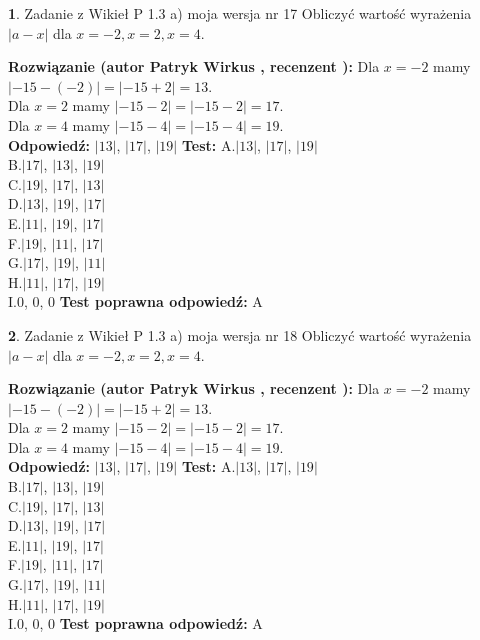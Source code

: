 \documentclass[12pt, a4paper]{article}
\theoremstyle{definition} %
\newtheorem{zad}{}
\newcommand{\zadStart}[1]{\begin{zad}#1\newline}
\newcommand{\zadStop}{\end{zad}}
\newcommand{\rozwStart}[2]{\noindent \textbf{Rozwiązanie (autor #1 , recenzent #2): }\newline}
\newcommand{\rozwStop}{\newline}
\newcommand{\odpStart}{\noindent \textbf{Odpowiedź:}\newline}
\newcommand{\odpStop}{\newline}
\newcommand{\testStart}{\noindent \textbf{Test:}\newline}
\newcommand{\testStop}{\newline}
\newcommand{\kluczStart}{\noindent \textbf{Test poprawna odpowiedź:}\newline}
\newcommand{\kluczStop}{\newline}
\begin{document}
\zadStart{Zadanie z Wikieł P 1.3 a) moja wersja nr 17}
Obliczyć wartość wyrażenia $|a - x|$ dla $x=-2,x=2,x=4$.
\zadStop
\rozwStart{Patryk Wirkus}{}
Dla $x = -2$ mamy $|-15 - (-2)| = |-15 + 2| = 13$.\\
Dla $x = 2$ mamy $|-15 - 2| = |-15 - 2| = 17$.\\
Dla $x = 4$ mamy $|-15 - 4| = |-15 - 4| = 19$.\\
\rozwStop
\odpStart
$|13|$, $|17|$, $|19|$
\odpStop
\testStart
A.$|13|$, $|17|$, $|19|$\\
B.$|17|$, $|13|$, $|19|$\\
C.$|19|$, $|17|$, $|13|$\\
D.$|13|$, $|19|$, $|17|$\\
E.$|11|$, $|19|$, $|17|$\\
F.$|19|$, $|11|$, $|17|$\\
G.$|17|$, $|19|$, $|11|$\\
H.$|11|$, $|17|$, $|19|$\\
I.$0$, $0$, $0$
\testStop
\kluczStart
A
\kluczStop



\zadStart{Zadanie z Wikieł P 1.3 a) moja wersja nr 18}
Obliczyć wartość wyrażenia $|a - x|$ dla $x=-2,x=2,x=4$.
\zadStop
\rozwStart{Patryk Wirkus}{}
Dla $x = -2$ mamy $|-15 - (-2)| = |-15 + 2| = 13$.\\
Dla $x = 2$ mamy $|-15 - 2| = |-15 - 2| = 17$.\\
Dla $x = 4$ mamy $|-15 - 4| = |-15 - 4| = 19$.\\
\rozwStop
\odpStart
$|13|$, $|17|$, $|19|$
\odpStop
\testStart
A.$|13|$, $|17|$, $|19|$\\
B.$|17|$, $|13|$, $|19|$\\
C.$|19|$, $|17|$, $|13|$\\
D.$|13|$, $|19|$, $|17|$\\
E.$|11|$, $|19|$, $|17|$\\
F.$|19|$, $|11|$, $|17|$\\
G.$|17|$, $|19|$, $|11|$\\
H.$|11|$, $|17|$, $|19|$\\
I.$0$, $0$, $0$
\testStop
\kluczStart
A
\kluczStop
\end{document}
